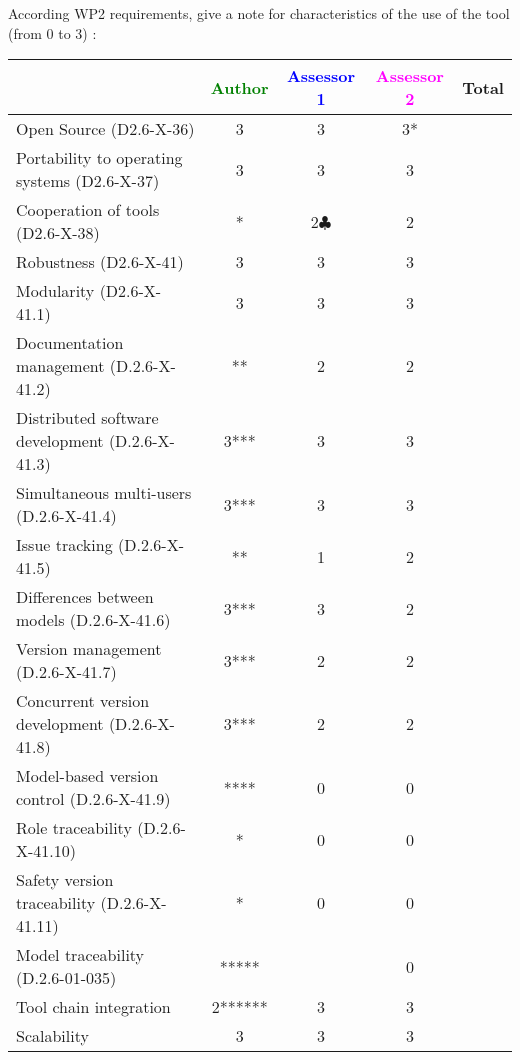 \begin{assesor1}
According WP2 requirements, give a note for characteristics of the use of the tool (from 0 to 3) :

\begin{tabular}{|l | c | c | c | c|}
\hline
& \textcolor{green}{Author} & \textcolor{blue}{Assessor 1} & \textcolor{magenta}{Assessor 2} & Total \\
\hline
Open Source (D2.6-X-36) &3 &3 &3* & \\
\hline
Portability to operating systems (D2.6-X-37) &3 &3 &3 & \\
\hline
Cooperation of tools (D2.6-X-38) &* &2$\clubsuit$ &2 & \\
\hline
Robustness (D2.6-X-41) &3 &3 &3 & \\
\hline
Modularity (D2.6-X-41.1) &3 &3 &3 & \\
\hline
Documentation management (D.2.6-X-41.2) &** &2 &2 & \\
\hline
Distributed software development (D.2.6-X-41.3) &3*** &3 &3 & \\
\hline
Simultaneous multi-users (D.2.6-X-41.4) &3*** & 3&3 & \\
\hline
Issue tracking (D.2.6-X-41.5) &** &1 &2 & \\
\hline
Differences between models (D.2.6-X-41.6) &3*** &3 &2 & \\
\hline
Version management (D.2.6-X-41.7) &3*** &2 &2 & \\
\hline
Concurrent version development (D.2.6-X-41.8) &3*** &2 &2 & \\
\hline
Model-based version control (D.2.6-X-41.9) &**** &0 &0 & \\
\hline
Role traceability (D.2.6-X-41.10) &* &0 &0 & \\
\hline
Safety version traceability (D.2.6-X-41.11) &* &0 &0 & \\
\hline
Model traceability (D.2.6-01-035) &***** & &0 & \\
\hline
Tool chain integration &2****** &3 &3 & \\
\hline
Scalability &3 &3 &3 & \\
\hline
\end{tabular}


\end{assesor1}
